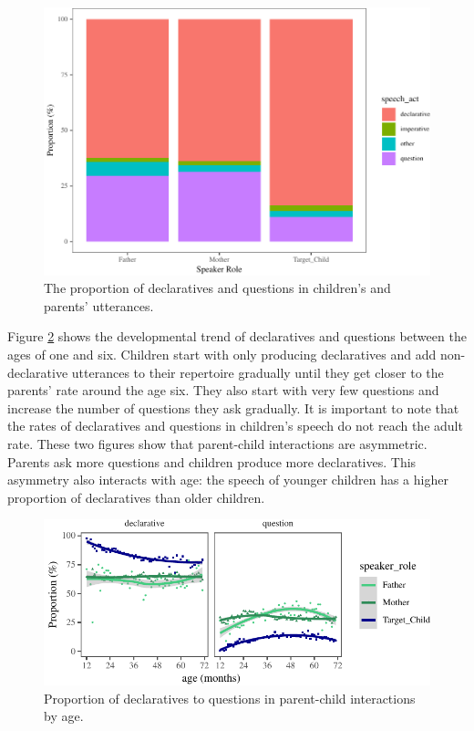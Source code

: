 \documentclass[,man,floatsintext]{apa6}
\begin{document}
\begin{figure}[tb]

{\centering \includegraphics{figs/totalUtteranceTypePlot-1} 

}

\caption{The proportion of declaratives and questions in children's and parents' utterances.}\label{fig:totalUtteranceTypePlot}
\end{figure}

Figure \ref{fig:utteranceTypeByAgePlot} shows the developmental trend of declaratives and questions between the ages of one and six. Children start with only producing declaratives and add non-declarative utterances to their repertoire gradually until they get closer to the parents' rate around the age six. They also start with very few questions and increase the number of questions they ask gradually. It is important to note that the rates of declaratives and questions in children's speech do not reach the adult rate. These two figures show that parent-child interactions are asymmetric. Parents ask more questions and children produce more declaratives. This asymmetry also interacts with age: the speech of younger children has a higher proportion of declaratives than older children.

\begin{figure}
\centering
\includegraphics{figs/utteranceTypeByAgePlot-1.pdf}
\caption{\label{fig:utteranceTypeByAgePlot}Proportion of declaratives to questions in parent-child interactions by age.}
\end{figure}
\end{document}
